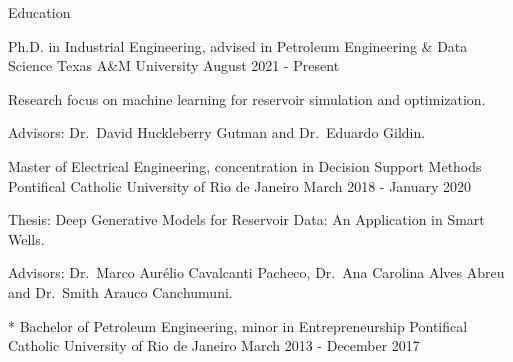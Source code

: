 \begin{cvcontentsection}{Education}

\begin{cvjob}
    {Ph.D. in Industrial Engineering, advised in Petroleum Engineering \& Data Science}
    {Texas A\&M University}
    {}
    {August 2021 - Present}
    \item Research focus on machine learning for reservoir simulation and optimization.
    \item Advisors: Dr.\ David Huckleberry Gutman and Dr.\ Eduardo Gildin.
\end{cvjob}

\begin{cvjob}
    {Master of Electrical Engineering, concentration in Decision Support Methods}
    {Pontifical Catholic University of Rio de Janeiro}
    {}
    {March 2018 - January 2020}
    \item Thesis: Deep Generative Models for Reservoir Data: An Application in Smart Wells.
    \item Advisors: Dr.\ Marco Aurélio Cavalcanti Pacheco, Dr.\ Ana Carolina Alves Abreu and Dr.\ Smith Arauco Canchumuni.
\end{cvjob}

\begin{cvjob}*
    {Bachelor of Petroleum Engineering, minor in Entrepreneurship}
    {Pontifical Catholic University of Rio de Janeiro}
    {}
    {March 2013 - December 2017}
\end{cvjob}

\end{cvcontentsection}
